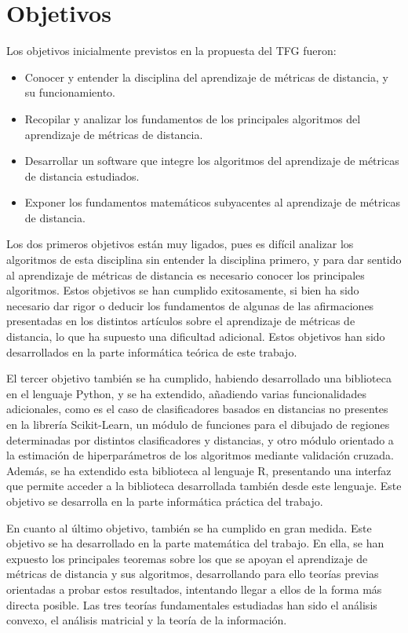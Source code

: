 \section{Objetivos}

Los objetivos inicialmente previstos en la propuesta del TFG fueron:
\begin{itemize}
    \item Conocer y entender la disciplina del aprendizaje de métricas de distancia, y su funcionamiento.
    \item Recopilar y analizar los fundamentos de los principales algoritmos del aprendizaje de métricas de distancia.
    \item Desarrollar un software que integre los algoritmos del aprendizaje de métricas de distancia estudiados.
    \item Exponer los fundamentos matemáticos subyacentes al aprendizaje de métricas de distancia.
\end{itemize}

Los dos primeros objetivos están muy ligados, pues es difícil analizar los algoritmos de esta disciplina sin entender la disciplina primero, y para dar sentido al aprendizaje de métricas de distancia es necesario conocer los principales algoritmos. Estos objetivos se han cumplido exitosamente, si bien ha sido necesario dar rigor o deducir los fundamentos de algunas de las afirmaciones presentadas en los distintos artículos sobre el aprendizaje de métricas de distancia, lo que ha supuesto una dificultad adicional. Estos objetivos han sido desarrollados en la parte informática teórica de este trabajo.

El tercer objetivo también se ha cumplido, habiendo desarrollado una biblioteca en el lenguaje Python, y se ha extendido, añadiendo varias funcionalidades adicionales, como es el caso de clasificadores basados en distancias no presentes en la librería Scikit-Learn, un módulo de funciones para el dibujado de regiones determinadas por distintos clasificadores y distancias, y otro módulo orientado a la estimación de hiperparámetros de los algoritmos mediante validación cruzada. Además, se ha extendido esta biblioteca al lenguaje R, presentando una interfaz que permite acceder a la biblioteca desarrollada también desde este lenguaje. Este objetivo se desarrolla en la parte informática práctica del trabajo.

En cuanto al último objetivo, también se ha cumplido en gran medida. Este objetivo se ha desarrollado en la parte matemática del trabajo. En ella, se han expuesto los principales teoremas sobre los que se apoyan el aprendizaje de métricas de distancia y sus algoritmos, desarrollando para ello teorías previas orientadas a probar estos resultados, intentando llegar a ellos de la forma más directa posible. Las tres teorías fundamentales estudiadas han sido el análisis convexo, el análisis matricial y la teoría de la información.

